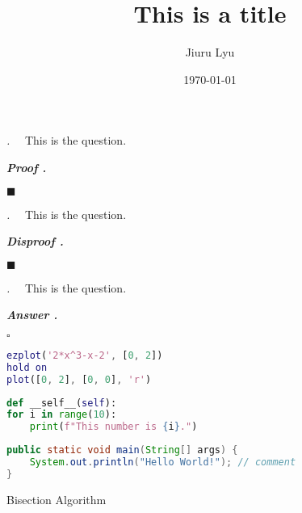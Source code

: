 \documentclass[12pt, a4paper]{article}
\title{\textbf{This is a title}}
\author{Jiuru Lyu}
\date{\today}
\theoremstyle{definition}
\newcounter{nq}[section]
\newenvironment*{question}{\noindent\emph{\stepcounter{nq}\thenq.$\quad $}\noindent\ttfamily}{}
\newcounter{np}[section]
\newenvironment*{prf}{\par\noindent\textbf{\textit{Proof \stepcounter{np}\thenp. }}\par}{\par\hfill $\blacksquare$\par}
\newenvironment*{ans}{\par\indent\textbf{\textit{Answer \stepcounter{np}\thenp. }}\par}{\par\hfill{$\square$}\par}
\newenvironment*{dis}{\par\noindent\textbf{\textit{Disproof \stepcounter{np}\thenp. }}\par}{\par\hfill $\blacksquare$\par}
\begin{document}
\maketitle\thispagestyle{fancy}

\begin{question}
	This is the question.	
\end{question}
\begin{prf}
	
\end{prf}

\begin{question}
	This is the question.	
\end{question}
\begin{dis}
	
\end{dis}

\begin{question}
	This is the question.	
\end{question}
\begin{ans}
	
\end{ans}

\begin{lstlisting}[language = Matlab, title = {Answer.m}]
% Plot function f(x) = 2*x^3 - x - 2
ezplot('2*x^3-x-2', [0, 2])
hold on
plot([0, 2], [0, 0], 'r')
\end{lstlisting}

\begin{lstlisting}[language = Python]
def __self__(self):
for i in range(10):
	print(f"This number is {i}.")
\end{lstlisting}

\begin{lstlisting}[language = java]
public static void main(String[] args) {
	System.out.println("Hello World!"); // comment
}
\end{lstlisting}


\begin{algorithm}
\caption{Bisection Algorithm}
\DontPrintSemicolon
{}
\BlankLine
{}
\end{algorithm}

\label{LastPage}
\end{document}
